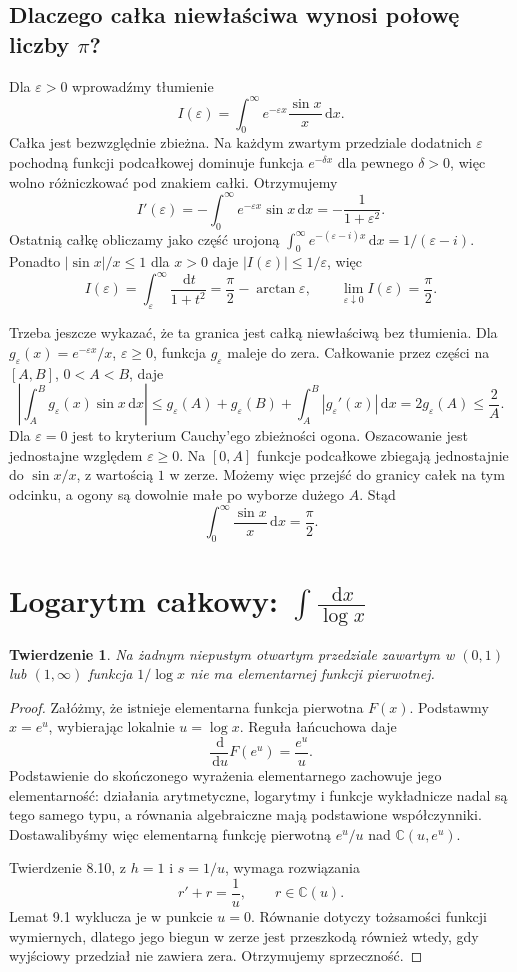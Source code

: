 \documentclass[11pt,a4paper,oneside]{book}
\numberwithin{equation}{section}
\theoremstyle{plain}
\newtheorem{twierdzenie}{Twierdzenie}[chapter]
\theoremstyle{definition}
\theoremstyle{remark}
\newcommand{\C}{\mathbb{C}}
\newcommand{\dd}{\,\mathrm{d}}
\begin{document}
\subsection{Dlaczego całka niewłaściwa wynosi połowę liczby $\pi$?}

Dla $\varepsilon>0$ wprowadźmy tłumienie
\[
I(\varepsilon)=\int_0^\infty e^{-\varepsilon x}\frac{\sin x}{x}\dd x.
\]
Całka jest bezwzględnie zbieżna. Na każdym zwartym przedziale dodatnich $\varepsilon$ pochodną funkcji podcałkowej dominuje funkcja $e^{-\delta x}$ dla pewnego $\delta>0$, więc wolno różniczkować pod znakiem całki. Otrzymujemy
\[
I'(\varepsilon)=-\int_0^\infty e^{-\varepsilon x}\sin x\dd x
=-\frac1{1+\varepsilon^2}.
\]
Ostatnią całkę obliczamy jako część urojoną $\int_0^\infty e^{-(\varepsilon-i)x}\dd x=1/(\varepsilon-i)$. Ponadto $|\sin x|/x\le1$ dla $x>0$ daje $|I(\varepsilon)|\le1/\varepsilon$, więc
\[
I(\varepsilon)=\int_\varepsilon^\infty\frac{\dd t}{1+t^2}
=\frac\pi2-\arctan\varepsilon,
\qquad\lim_{\varepsilon\downarrow0}I(\varepsilon)=\frac\pi2.
\]

Trzeba jeszcze wykazać, że ta granica jest całką niewłaściwą bez tłumienia. Dla $g_\varepsilon(x)=e^{-\varepsilon x}/x$, $\varepsilon\ge0$, funkcja $g_\varepsilon$ maleje do zera. Całkowanie przez części na $[A,B]$, $0<A<B$, daje
\[
\left|\int_A^B g_\varepsilon(x)\sin x\dd x\right|
\le g_\varepsilon(A)+g_\varepsilon(B)
+\int_A^B|g_\varepsilon'(x)|\dd x
=2g_\varepsilon(A)\le\frac2A.
\]
Dla $\varepsilon=0$ jest to kryterium Cauchy'ego zbieżności ogona. Oszacowanie jest jednostajne względem $\varepsilon\ge0$. Na $[0,A]$ funkcje podcałkowe zbiegają jednostajnie do $\sin x/x$, z wartością $1$ w zerze. Możemy więc przejść do granicy całek na tym odcinku, a ogony są dowolnie małe po wyborze dużego $A$. Stąd
\[
\int_0^\infty\frac{\sin x}{x}\dd x=\frac\pi2.
\]

\section{Logarytm całkowy: $\int \frac{\dd x}{\log x}$}

\begin{twierdzenie}
Na żadnym niepustym otwartym przedziale zawartym w $(0,1)$ lub $(1,\infty)$ funkcja $1/\log x$ nie ma elementarnej funkcji pierwotnej.
\end{twierdzenie}
\begin{proof}
Załóżmy, że istnieje elementarna funkcja pierwotna $F(x)$. Podstawmy $x=e^u$, wybierając lokalnie $u=\log x$. Reguła łańcuchowa daje
\[
\frac{\dd}{\dd u}F(e^u)=\frac{e^u}{u}.
\]
Podstawienie do skończonego wyrażenia elementarnego zachowuje jego elementarność: działania arytmetyczne, logarytmy i funkcje wykładnicze nadal są tego samego typu, a równania algebraiczne mają podstawione współczynniki. Dostawalibyśmy więc elementarną funkcję pierwotną $e^u/u$ nad $\C(u,e^u)$.

Twierdzenie 8.10, z $h=1$ i $s=1/u$, wymaga rozwiązania
\[
r'+r=\frac1u,\qquad r\in\C(u).
\]
Lemat 9.1 wyklucza je w punkcie $u=0$. Równanie dotyczy tożsamości funkcji wymiernych, dlatego jego biegun w zerze jest przeszkodą również wtedy, gdy wyjściowy przedział nie zawiera zera. Otrzymujemy sprzeczność.
\end{proof}
\end{document}
